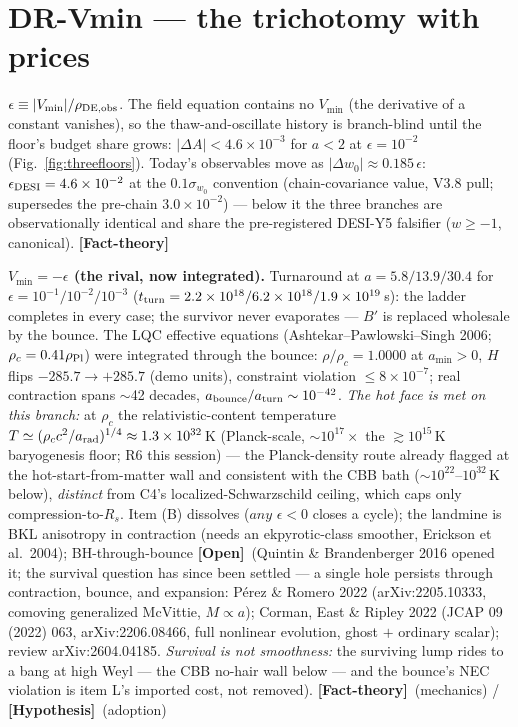 \documentclass[11pt]{article}
\newcommand{\factth}{\textcolor{green!40!black}{\textbf{[Fact-theory]}}}
\newcommand{\hyp}{\textcolor{orange!80!black}{\textbf{[Hypothesis]}}}
\newcommand{\open}{\textcolor{red!70!black}{\textbf{[Open]}}}
\begin{document}
\section{DR-Vmin --- the trichotomy with prices}
$\epsilon\equiv|V_{\min}|/\rho_{\rm DE,obs}$. The field equation contains no $V_{\min}$ (the derivative of a constant vanishes), so the thaw-and-oscillate history is branch-blind until the floor's budget share grows: $|\Delta A|<4.6\times10^{-3}$ for $a<2$ at $\epsilon=10^{-2}$ (Fig.~\ref{fig:threefloors}). Today's observables move as $|\Delta w_0|\approx0.185\,\epsilon$: \textbf{$\epsilon_{\rm DESI}=4.6\times10^{-2}$} at the $0.1\sigma_{w_0}$ convention (chain-covariance value, V3.8 pull; supersedes the pre-chain $3.0\times10^{-2}$) --- below it the three branches are observationally identical and share the pre-registered DESI-Y5 falsifier ($w\ge-1$, canonical). \factth

\textbf{$V_{\min}=-\epsilon$ (the rival, now integrated).} Turnaround at $a=5.8/13.9/30.4$ for $\epsilon=10^{-1}/10^{-2}/10^{-3}$ ($t_{\rm turn}=2.2\times10^{18}/6.2\times10^{18}/1.9\times10^{19}$\,s): the ladder completes in every case; the survivor never evaporates --- $B'$ is replaced wholesale by the bounce. The LQC effective equations (Ashtekar--Pawlowski--Singh 2006; $\rho_c=0.41\rho_{\rm Pl}$) were integrated through the bounce: $\rho/\rho_c=1.0000$ at $a_{\min}>0$, $H$ flips $-285.7\to+285.7$ (demo units), constraint violation $\le8\times10^{-7}$; real contraction spans $\sim$42 decades, $a_{\rm bounce}/a_{\rm turn}\sim10^{-42}$. \emph{The hot face is met on this branch:} at $\rho_c$ the relativistic-content temperature $T\simeq(\rho_c c^2/a_{\rm rad})^{1/4}\approx1.3\times10^{32}$\,K (Planck-scale, $\sim10^{17}\times$ the $\gtrsim10^{15}$\,K baryogenesis floor; R6 this session) --- the Planck-density route already flagged at the hot-start-from-matter wall and consistent with the CBB bath ($\sim10^{22}$--$10^{32}$\,K below), \emph{distinct} from C4's localized-Schwarzschild ceiling, which caps only compression-to-$R_s$. Item (B) dissolves ($any$ $\epsilon<0$ closes a cycle); the landmine is BKL anisotropy in contraction (needs an ekpyrotic-class smoother, Erickson et al.\ 2004); BH-through-bounce \open\ (Quintin \& Brandenberger 2016 opened it; the survival question has since been settled --- a single hole persists through contraction, bounce, and expansion: P\'erez \& Romero 2022 (arXiv:2205.10333, comoving generalized McVittie, $M\propto a$); Corman, East \& Ripley 2022 (JCAP 09 (2022) 063, arXiv:2206.08466, full nonlinear evolution, ghost $+$ ordinary scalar); review arXiv:2604.04185. \emph{Survival is not smoothness:} the surviving lump rides to a bang at high Weyl --- the CBB no-hair wall below --- and the bounce's NEC violation is item L's imported cost, not removed). \factth\ (mechanics) / \hyp\ (adoption)
\end{document}

